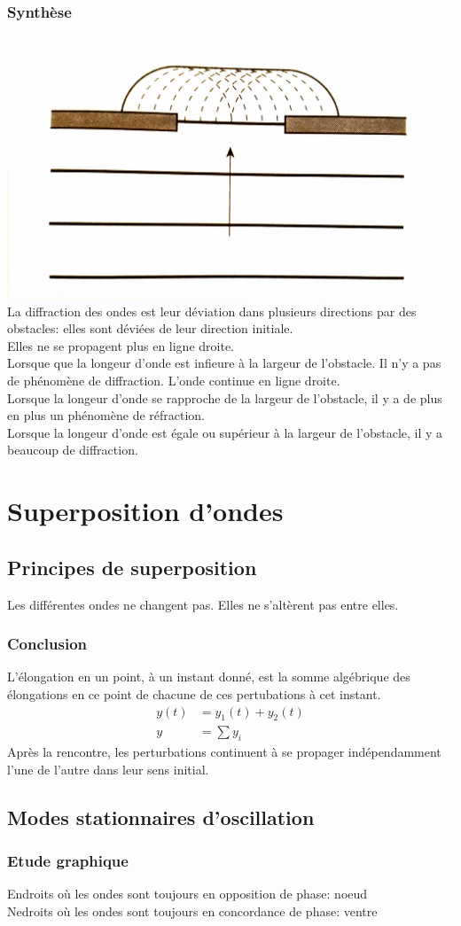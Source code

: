 \documentclass[11pt]{article}
\begin{document}
\subsubsection{Synthèse}
\includegraphics[scale=0.1]{DiffractionOndes.png}\\

La diffraction des ondes est leur déviation dans plusieurs directions par des obstacles: elles sont déviées de leur direction initiale.\\
Elles ne se propagent plus en ligne droite.\\
Lorsque que la longeur d'onde est infieure à la largeur de l'obstacle. Il n'y a pas de phénomène de diffraction. L'onde continue en ligne droite.\\
Lorsque la longeur d'onde se rapproche de la largeur de l'obstacle, il y a de plus en plus un phénomène de réfraction.\\
Lorsque la longeur d'onde est égale ou supérieur à la largeur de l'obstacle, il y a beaucoup de diffraction.


\section{Superposition d'ondes}
\subsection{Principes de superposition}
Les différentes ondes ne changent pas. Elles ne s'altèrent pas entre elles.
\subsubsection{Conclusion}
L'élongation en un point, à un instant donné, est la somme algébrique des élongations en ce point de chacune de ces pertubations à cet instant.\\
\begin{align}
    y(t)&=y_1(t)+y_2(t)\\
    y&=\sum y_i
\end{align}
Après la rencontre, les perturbations continuent à se propager indépendamment l'une de l'autre dans leur sens initial.
\subsection{Modes stationnaires d'oscillation}
\subsubsection{Etude graphique}
Endroits où les ondes sont toujours en opposition de phase: noeud\\
Nedroits où les ondes sont toujours en concordance de phase: ventre
\end{document}
